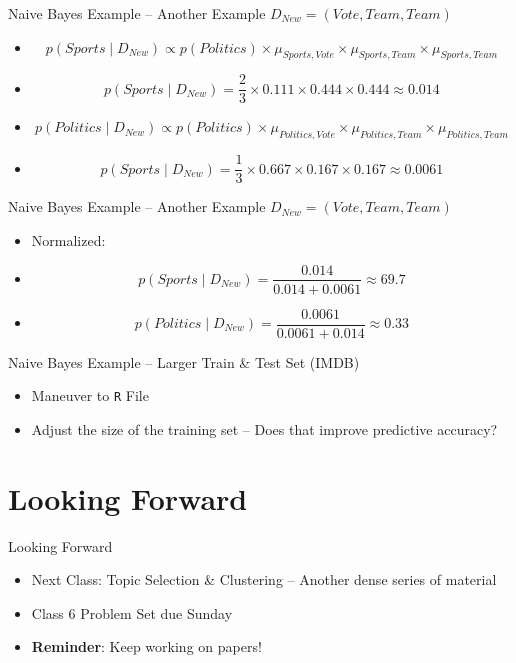 \documentclass[
  ignorenonframetext,
  aspectratio=169]{beamer}
\begin{document}
\begin{frame}{Naive Bayes Example -- Another Example
\(D_{New} = (Vote, Team, Team)\)}
\label{naive-bayes-example-another-example-d_new-vote-team-team}
\begin{itemize}
\pause
\item[] $$p(Sports\mid D_{New}) \propto p(Politics) \times \mu_{Sports,Vote} \times \mu_{Sports,Team}  \times  \mu_{Sports,Team}$$ 
\item[] $$p(Sports\mid D_{New}) = \frac{2}{3} \times 0.111 \times 0.444 \times 0.444 \approx 0.014$$ \pause
\item[] $$p(Politics\mid D_{New}) \propto p(Politics) \times \mu_{Politics,Vote} \times \mu_{Politics,Team}  \times  \mu_{Politics,Team}$$ 
\item[] $$p(Sports\mid D_{New}) = \frac{1}{3} \times 0.667 \times 0.167 \times 0.167 \approx 0.0061$$ 
\end{itemize}
\end{frame}

\begin{frame}{Naive Bayes Example -- Another Example
\(D_{New} = (Vote, Team, Team)\)}
\label{naive-bayes-example-another-example-d_new-vote-team-team-1}
\begin{itemize}
\item Normalized:
\item[] $$ p(Sports\mid D_{New}) = \frac{0.014}{0.014+0.0061} \approx 69.7$$
\item[] $$ p(Politics\mid D_{New}) = \frac{0.0061}{0.0061+0.014} \approx 0.33 $$
\end{itemize}
\end{frame}

\begin{frame}{Naive Bayes Example -- Larger Train \& Test Set (IMDB)}
\label{naive-bayes-example-larger-train-test-set-imdb}
\begin{itemize}
\item Maneuver to \texttt{R} File \pause
\item Adjust the size of the training set -- Does that improve predictive accuracy? 
\end{itemize}
\end{frame}

\section{Looking Forward}\label{looking-forward}

\begin{frame}{Looking Forward}
\begin{itemize}
\item Next Class: Topic Selection \& Clustering -- Another dense series of material 
\item Class 6 Problem Set due Sunday
\item \textbf{Reminder}: Keep working on papers!
\end{itemize}
\end{frame}
\end{document}
